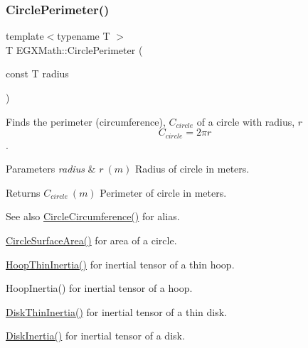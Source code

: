 \subsubsection{\texorpdfstring{Circle\+Perimeter()}{CirclePerimeter()}}
{\footnotesize\ttfamily template$<$typename T $>$ \\
T E\+G\+X\+Math\+::\+Circle\+Perimeter (\begin{DoxyParamCaption}\item[{const T}]{radius }\end{DoxyParamCaption})}



Finds the perimeter (circumference), $C_{circle}$ of a circle with radius, $r$ \[ C_{circle}=2 \pi r \]. 


\begin{DoxyParams}{Parameters}
{\em radius} & $ r\ (m)$ Radius of circle in meters. \\
\hline
\end{DoxyParams}
\begin{DoxyReturn}{Returns}
$ C_{circle}\ (m)$ Perimeter of circle in meters. 
\end{DoxyReturn}
\begin{DoxySeeAlso}{See also}
\mbox{\hyperlink{group___e_g_x_math-_geometry-2_d-_circle_gadb55695b75a06a3f3534494eb767e18e}{Circle\+Circumference()}} for alias. 

\mbox{\hyperlink{group___e_g_x_math-_geometry-2_d-_circle_gaa4486100a643c57bd7a80c1c11ae3f60}{Circle\+Surface\+Area()}} for area of a circle. 

\mbox{\hyperlink{group___e_g_x_math-_geometry-3_d-_hoop_gab3a84dc2aa29ce0db990425747d291c6}{Hoop\+Thin\+Inertia()}} for inertial tensor of a thin hoop. 

Hoop\+Inertia() for inertial tensor of a hoop. 

\mbox{\hyperlink{group___e_g_x_math-_geometry-3_d-_disk_ga8dcadf6cd5680294a84311c6767e3caf}{Disk\+Thin\+Inertia()}} for inertial tensor of a thin disk. 

\mbox{\hyperlink{group___e_g_x_math-_geometry-3_d-_disk_ga6ed461694b277e36a641a6550bdea68f}{Disk\+Inertia()}} for inertial tensor of a disk. 
\end{DoxySeeAlso}
\mbox{\label{group___e_g_x_math-_geometry-2_d-_circle_gaa4486100a643c57bd7a80c1c11ae3f60}} 
